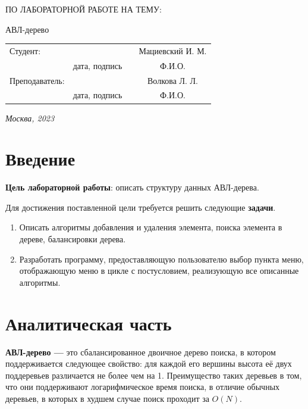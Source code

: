 \documentclass[12pt, a4paper]{article}
\begin{document}
\begin{titlepage}
\begin{center}
\begin{bf}
    \fontsize{20}{30}\selectfont
    ПО ЛАБОРАТОРНОЙ РАБОТЕ НА ТЕМУ:

    АВЛ-дерево

   \end{bf}
  \end{center}

  \fontsize{14}{21}\selectfont
  \vspace{5cm}


  \noindent\begin{tabularx}{\textwidth}{ X >{\centering}p{4cm} p{1cm} c }
   Студент: & & & Мациевский И. М. \\ \cline{2-2} \cline{4-4}
   & \fontsize{10}{15}\selectfont дата, подпись & & \fontsize{10}{15}\selectfont Ф.И.О. \\
   Преподаватель: & & & Волкова Л. Л.\\ \cline{2-2} \cline{4-4}
   & \fontsize{10}{15}\selectfont дата, подпись & & \fontsize{10}{15}\selectfont Ф.И.О.
   \end{tabularx}

  \vspace{\fill}

  \begin{center}
   \it{Москва}, 2023
  \end{center}

  \thispagestyle{empty}
\end{titlepage}\newpage
\tableofcontents
\newpage
\section*{Введение}
\justifying
\textbf{Цель лабораторной работы}: описать структуру 
данных АВЛ-дерева.

Для достижения поставленной цели требуется решить следующие 
\textbf{задачи}.
\begin{enumerate}
\item Описать алгоритмы добавления и удаления 
элемента, поиска элемента в дереве, балансировки дерева.
\item Разработать программу, предоставляющую пользователю выбор пункта 
меню, отображающую меню в цикле с постусловием, реализующую все описанные 
алгоритмы.
\end{enumerate}
\newpage
\section{Аналитическая часть}
\textbf{АВЛ-дерево ---} это сбалансированное двоичное дерево поиска, в 
котором поддерживается следующее свойство: для каждой его вершины высота её 
двух поддеревьев различается не более чем на 1.
Преимущество таких деревьев в том, что они поддерживают логарифмическое 
время поиска, в отличие обычных деревьев, в которых в худшем случае поиск
проходит за $O(N)$.
\end{document}
